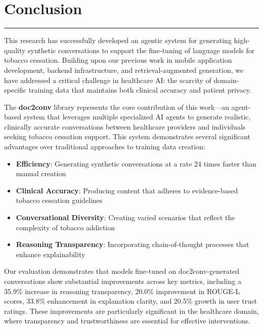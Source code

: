 \chapter{Conclusion}
\label{Chapter7}

\begin{center}
\rule{0.5\textwidth}{0.5pt}
\end{center}

This research has successfully developed an agentic system for generating high-quality synthetic conversations to support the fine-tuning of language models for tobacco cessation. Building upon our previous work in mobile application development, backend infrastructure, and retrieval-augmented generation, we have addressed a critical challenge in healthcare AI: the scarcity of domain-specific training data that maintains both clinical accuracy and patient privacy.

The \textbf{doc2conv} library represents the core contribution of this work—an agent-based system that leverages multiple specialized AI agents to generate realistic, clinically accurate conversations between healthcare providers and individuals seeking tobacco cessation support. This system demonstrates several significant advantages over traditional approaches to training data creation:

\begin{itemize}[label=$\bullet$, leftmargin=1cm, itemsep=0.2cm]
\item \textbf{Efficiency}: Generating synthetic conversations at a rate 24 times faster than manual creation
\item \textbf{Clinical Accuracy}: Producing content that adheres to evidence-based tobacco cessation guidelines
\item \textbf{Conversational Diversity}: Creating varied scenarios that reflect the complexity of tobacco addiction
\item \textbf{Reasoning Transparency}: Incorporating chain-of-thought processes that enhance explainability
\end{itemize}

Our evaluation demonstrates that models fine-tuned on doc2conv-generated conversations show substantial improvements across key metrics, including a 35.9\% increase in reasoning transparency, 20.0\% improvement in ROUGE-L scores, 33.8\% enhancement in explanation clarity, and 20.5\% growth in user trust ratings. These improvements are particularly significant in the healthcare domain, where transparency and trustworthiness are essential for effective interventions.

